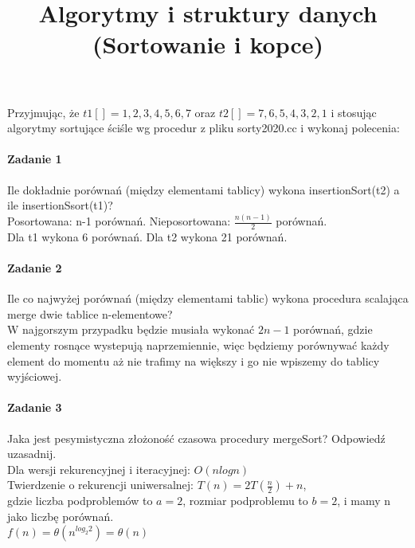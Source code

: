 \documentclass[18pt]{extarticle}
\begin{document}
\large
{}\selectfont

\title{Algorytmy i struktury danych (Sortowanie i kopce)}
\date{}
\maketitle

Przyjmując, że $t1[]={1,2,3,4,5,6,7}$ oraz $t2[]={7,6,5,4,3,2,1}$ i stosując algorytmy sortujące ściśle wg procedur z pliku sorty2020.cc i wykonaj polecenia:

\paragraph{Zadanie 1} Ile dokładnie porównań (między elementami  tablicy) wykona insertionSort(t2) a ile insertionSsort(t1)? \\

Posortowana: n-1 porównań. Nieposortowana: $\frac{n(n-1)}{2}$ porównań. \\
Dla t1 wykona 6 porównań. Dla t2 wykona 21 porównań.

\paragraph{Zadanie 2} Ile co najwyżej porównań (między elementami tablic) wykona procedura scalająca merge dwie tablice n-elementowe? \\


W najgorszym przypadku będzie musiała wykonać $2n - 1$ porównań, gdzie elementy rosnące wystepują naprzemiennie, więc będziemy porównywać każdy element do momentu aż nie trafimy na większy i go nie wpiszemy do tablicy wyjściowej.

\paragraph{Zadanie 3} Jaka jest pesymistyczna złożoność czasowa procedury mergeSort? Odpowiedź uzasadnij. \\


Dla wersji rekurencyjnej i iteracyjnej: $O(nlogn)$ \\

Twierdzenie o rekurencji uniwersalnej: $T(n) = 2T(\frac{n}{2}) + n$,\\ gdzie liczba podproblemów to $a = 2$, rozmiar podproblemu to $b = 2$, i mamy n jako liczbę porównań.\\

$f(n)=\theta(n^{log_{2}{2}})=\theta(n)$\\
\end{document}

